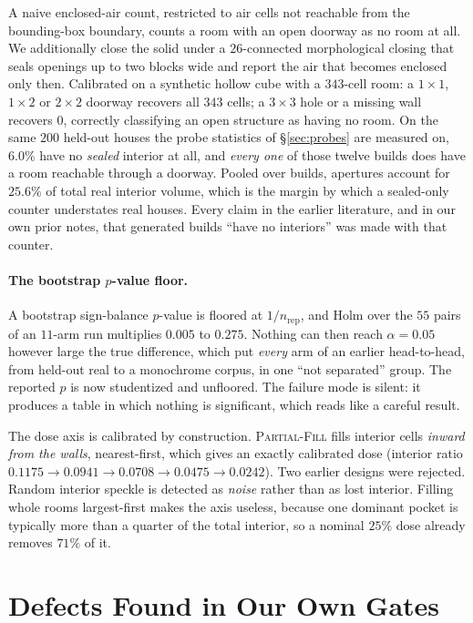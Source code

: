 A naive enclosed-air count, restricted to air cells not reachable from the
bounding-box boundary, counts a room with an open doorway as no room at all. We
additionally close
the solid under a $26$-connected morphological closing that seals openings up to
two blocks wide and report the air that becomes enclosed only then. Calibrated
on a synthetic hollow cube with a $343$-cell room: a $1{\times}1$, $1{\times}2$
or $2{\times}2$ doorway recovers all $343$ cells; a $3{\times}3$ hole or a
missing wall recovers $0$, correctly classifying an open structure as having no
room. On the same $200$ held-out houses the probe statistics of
\S\ref{sec:probes} are measured on, $\mathbf{6.0\%}$ have no \emph{sealed}
interior at all, and \emph{every one} of those twelve builds does have a room
reachable through a doorway. Pooled over builds, apertures account for
$\mathbf{25.6\%}$ of total real interior volume, which is the margin by which a
sealed-only counter understates real houses. Every claim in the earlier literature,
and in our own prior notes, that generated builds ``have no interiors'' was made
with that counter.

\paragraph{The bootstrap $p$-value floor.}
A bootstrap sign-balance $p$-value is floored at $1/n_{\text{rep}}$, and Holm
over the $55$ pairs of an $11$-arm run multiplies $0.005$ to $0.275$. Nothing
can then reach $\alpha=0.05$ however large the true difference, which put
\emph{every} arm of an earlier head-to-head, from held-out real to a monochrome
corpus, in one ``not separated'' group. The reported $p$ is now studentized and
unfloored. The failure mode is silent: it produces a table in which nothing is
significant, which reads like a careful result.

The dose axis is calibrated by construction. \textsc{Partial-Fill} fills
interior cells \emph{inward from the walls}, nearest-first, which gives an
exactly calibrated dose (interior ratio $0.1175 \to 0.0941 \to 0.0708 \to
0.0475 \to 0.0242$). Two earlier designs were rejected. Random interior speckle
is detected as \emph{noise} rather than as lost interior. Filling whole rooms
largest-first makes the axis useless, because one dominant pocket is typically
more than a quarter of the total interior, so a nominal $25\%$ dose already
removes $71\%$ of it.

\section{Defects Found in Our Own Gates}
\label{app:defects}

